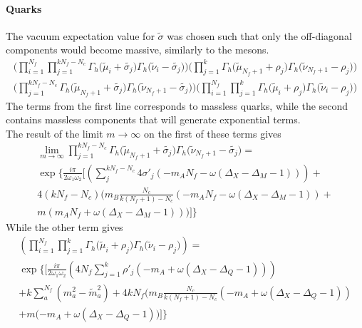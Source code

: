 \paragraph{Quarks}
The vacuum expectation value for $\tilde{\sigma}$ was chosen such that only the off-diagonal components would become massive, similarly to the mesons.
\begin{equation}
\begin{aligned}
\bigg( \prod_{i=1}^{N_f} \prod_{j=1}^{k N_f - N_c } \Gamma_h \big( \tilde \mu_i + \tilde{\sigma_j} \big) \Gamma_h \big( \tilde \nu_i - \tilde{\sigma_j} \big) \bigg)
\bigg(\prod_{j=1}^{k} \Gamma_h \big( \tilde \mu_{N_f+1} + \rho_j \big) \Gamma_h \big( \tilde \nu_{N_f+1} - \rho_j \big) \bigg)\\
\bigg( \prod_{j=1}^{k N_f - N_c}   \Gamma_h \big( \tilde \mu_{N_f+1} + \tilde{\sigma_j} \big) \Gamma_h \big( \tilde \nu_{N_f+1} - \tilde{\sigma_j} \big) \bigg)
\bigg( \prod_{i=1}^{N_f} \prod_{j=1}^{k } \Gamma_h \big( \tilde \mu_i + \rho_j \big) \Gamma_h \big( \tilde \nu_i - \rho_j \big) \bigg)
\end{aligned}
\end{equation}
The terms from the first line corresponds to massless quarks, while the second contains massless components that will generate exponential terms.\\
The result of the limit $ m \rightarrow \infty$ on the first of these terms gives 
\begin{multline}
\lim_{m \rightarrow \infty} \prod_{j=1}^{k N_f - N_c}   \Gamma_h \big(\tilde \mu_{N_f+1} + \tilde{\sigma_j} \big) \Gamma_h \big( \tilde \nu_{N_f+1} - \tilde{\sigma_j} \big) = \\ 
\exp
\biggl \{ \frac{i \pi}{2 \omega_1 \omega_2}
\biggl[ 
\left(
\sum_j^{k N_f - N_c} 4 \sigma'_j \left( - m_A N_f -  \omega( \Delta_X - \Delta_M - 1) \right)  \right) +  \\
4 (k N_f - N_c) \biggl(  m_B \frac{N_c}{k(N_f +1)- N_c}  \left(-  m_A N_f - \omega( \Delta_X - \Delta_M - 1)\right) + \\
 m \left(  m_A N_f + \omega( \Delta_X - \Delta_M - 1)\right)\biggr)
\biggr]
 \biggr\}
\end{multline}
While the other term gives 
\begin{multline}
\left( \prod_{i=1}^{N_f} \prod_{j=1}^{k } \Gamma_h \big( \tilde \mu_i + \rho_j \big) \Gamma_h \big( \tilde \nu_i - \rho_j \big) \right) 
= \\
\exp
\biggl \{ 
\biggr[
\frac{i \pi}{2 \omega_1 \omega_2}
\left( 4 N_f \sum_{j=1}^k  \rho'_j \left( - m_A +  \omega ( \Delta_X - \Delta_Q - 1) \right) \right) \\
+  k \sum_a^{N_f} (m_a^2 - \tilde{m}_a^2) + 4 k N_f \biggl(  m_B \frac{N_c}{k(N_f +1)- N_c}  \left(- m_A +  \omega ( \Delta_X - \Delta_Q - 1)\right) \\
+ m ( - m_A +  \omega ( \Delta_X - \Delta_Q - 1)\biggr) 
\biggr]
\biggr\}
\end{multline}


